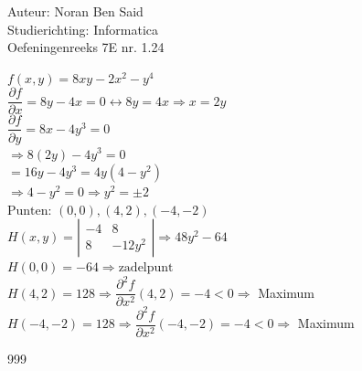 \documentclass[a4paper]{article}
\begin{document}
  
\noindent \large Auteur: Noran Ben Said \\
\noindent \large Studierichting: Informatica\\
\noindent \large Oefeningenreeks 7E nr. 1.24\\

\medskip

\normalsize

$f(x,y) = 8xy -2x^2 - y^4$\\

$\dfrac{\partial f}{\partial x} = 8y - 4x = 0 \leftrightarrow 8y = 4x\Rightarrow x = 2y$\\

$\dfrac{\partial f}{\partial y} = 8x-4y^3 = 0$\\

$\Rightarrow 8(2y)-4y^3 = 0$\\

$= 16y - 4y^3 = 4y (4-y^2)$\\

$ \Rightarrow 4 - y^2 = 0 \Rightarrow y^2 = \pm 2$\\

$\text{Punten: } (0,0), (4,2), (-4,-2)$\\

$H(x,y) = 
\left|
\begin{array}{ccc}
-4 & 8\\
8 & -12y^2
\end{array}
\right|
\Rightarrow 48y^2 -64$\\

$H(0, 0) = -64 \Rightarrow \text{zadelpunt}$\\

$H(4, 2) = 128 \Rightarrow \dfrac{\partial^2 f}{\partial x^2}(4,2) = -4 < 0 \Rightarrow $ Maximum\\

$H(-4, -2) = 128 \Rightarrow \dfrac{\partial^2 f}{\partial x^2}(-4,-2) = -4 < 0 \Rightarrow$ Maximum\\

\begin{thebibliography}{999}
\end{thebibliography}
\end{document}
